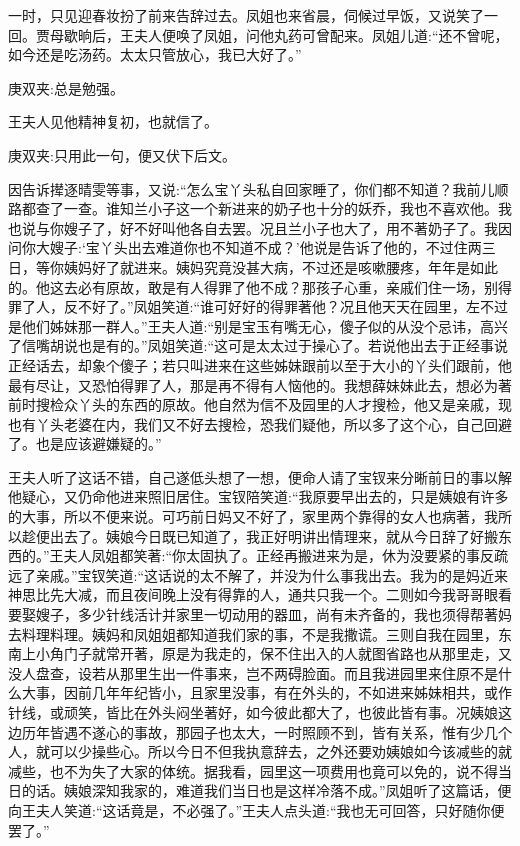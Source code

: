 \begin{parag}
    一时，只见迎春妆扮了前来告辞过去。凤姐也来省晨，伺候过早饭，又说笑了一回。贾母歇晌后，王夫人便唤了凤姐，问他丸药可曾配来。凤姐儿道:“还不曾呢，如今还是吃汤药。太太只管放心，我已大好了。”\begin{note}庚双夹:总是勉强。\end{note}王夫人见他精神复初，也就信了。\begin{note}庚双夹:只用此一句，便又伏下后文。\end{note}因告诉撵逐晴雯等事，又说:“怎么宝丫头私自回家睡了，你们都不知道？我前儿顺路都查了一查。谁知兰小子这一个新进来的奶子也十分的妖乔，我也不喜欢他。我也说与你嫂子了，好不好叫他各自去罢。况且兰小子也大了，用不著奶子了。我因问你大嫂子:‘宝丫头出去难道你也不知道不成？’他说是告诉了他的，不过住两三日，等你姨妈好了就进来。姨妈究竟没甚大病，不过还是咳嗽腰疼，年年是如此的。他这去必有原故，敢是有人得罪了他不成？那孩子心重，亲戚们住一场，别得罪了人，反不好了。”凤姐笑道:“谁可好好的得罪著他？况且他天天在园里，左不过是他们姊妹那一群人。”王夫人道:“别是宝玉有嘴无心，傻子似的从没个忌讳，高兴了信嘴胡说也是有的。”凤姐笑道:“这可是太太过于操心了。若说他出去于正经事说正经话去，却象个傻子；若只叫进来在这些姊妹跟前以至于大小的丫头们跟前，他最有尽让，又恐怕得罪了人，那是再不得有人恼他的。我想薛妹妹此去，想必为著前时搜检众丫头的东西的原故。他自然为信不及园里的人才搜检，他又是亲戚，现也有丫头老婆在内，我们又不好去搜检，恐我们疑他，所以多了这个心，自己回避了。也是应该避嫌疑的。”
\end{parag}


\begin{parag}
    王夫人听了这话不错，自己遂低头想了一想，便命人请了宝钗来分晰前日的事以解他疑心，又仍命他进来照旧居住。宝钗陪笑道:“我原要早出去的，只是姨娘有许多的大事，所以不便来说。可巧前日妈又不好了，家里两个靠得的女人也病著，我所以趁便出去了。姨娘今日既已知道了，我正好明讲出情理来，就从今日辞了好搬东西的。”王夫人凤姐都笑著:“你太固执了。正经再搬进来为是，休为没要紧的事反疏远了亲戚。”宝钗笑道:“这话说的太不解了，并没为什么事我出去。我为的是妈近来神思比先大减，而且夜间晚上没有得靠的人，通共只我一个。二则如今我哥哥眼看要娶嫂子，多少针线活计并家里一切动用的器皿，尚有未齐备的，我也须得帮著妈去料理料理。姨妈和凤姐姐都知道我们家的事，不是我撒谎。三则自我在园里，东南上小角门子就常开著，原是为我走的，保不住出入的人就图省路也从那里走，又没人盘查，设若从那里生出一件事来，岂不两碍脸面。而且我进园里来住原不是什么大事，因前几年年纪皆小，且家里没事，有在外头的，不如进来姊妹相共，或作针线，或顽笑，皆比在外头闷坐著好，如今彼此都大了，也彼此皆有事。况姨娘这边历年皆遇不遂心的事故，那园子也太大，一时照顾不到，皆有关系，惟有少几个人，就可以少操些心。所以今日不但我执意辞去，之外还要劝姨娘如今该减些的就减些，也不为失了大家的体统。据我看，园里这一项费用也竟可以免的，说不得当日的话。姨娘深知我家的，难道我们当日也是这样冷落不成。”凤姐听了这篇话，便向王夫人笑道:“这话竟是，不必强了。”王夫人点头道:“我也无可回答，只好随你便罢了。”
\end{parag}


